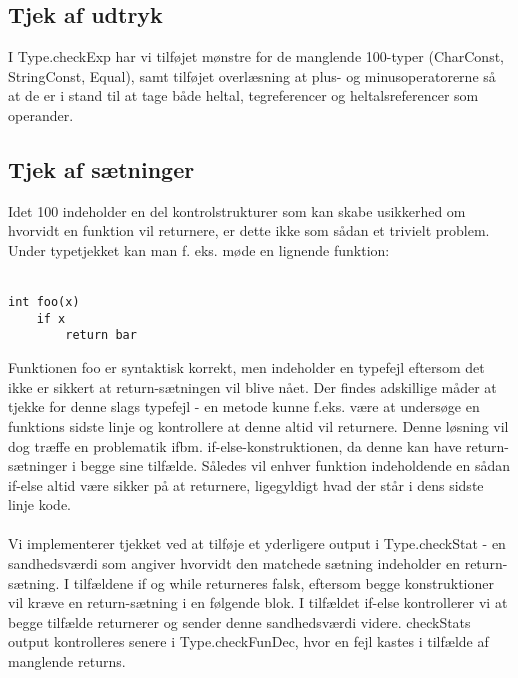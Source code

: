 \documentclass[10pt,a4paper,danish]{article}
\begin{document}
\subsection{Tjek af udtryk}
I Type.checkExp har vi tilføjet mønstre for de manglende 100-typer (CharConst, 
StringConst, Equal), samt tilføjet overlæsning at plus- og minusoperatorerne
så at de er i stand til at tage både heltal, tegreferencer og heltalsreferencer
som operander.  

\subsection{Tjek af sætninger}
Idet 100 indeholder en del kontrolstrukturer som kan skabe usikkerhed om 
hvorvidt en funktion vil returnere, er dette ikke som sådan et trivielt problem.
Under typetjekket kan man f. eks. møde en lignende funktion:\\\\

\begin{verbatim}
int foo(x)
    if x 
        return bar
\end{verbatim}

Funktionen foo er syntaktisk korrekt, men indeholder 
en typefejl eftersom det ikke er sikkert at return-sætningen vil
blive nået. Der findes adskillige måder at tjekke for denne slags typefejl -
en metode kunne f.eks. være at undersøge en funktions sidste linje og 
kontrollere at denne altid vil returnere. Denne løsning vil dog
træffe en problematik ifbm. if-else-konstruktionen, da denne
kan have return-sætninger i begge sine tilfælde. Således  vil enhver
funktion indeholdende en sådan if-else altid være sikker på at returnere, 
ligegyldigt hvad der står i dens sidste linje kode.

\paragraph{}
Vi implementerer tjekket ved at tilføje et yderligere output i Type.checkStat - 
en sandhedsværdi som angiver hvorvidt den matchede sætning indeholder
en return-sætning. I tilfældene if og while returneres falsk,
eftersom begge konstruktioner vil kræve en return-sætning i en følgende
blok. I tilfældet if-else kontrollerer vi at begge tilfælde returnerer og 
sender denne sandhedsværdi videre. checkStats output kontrolleres senere
i Type.checkFunDec, hvor en fejl kastes i tilfælde af manglende returns. 
\end{document}
